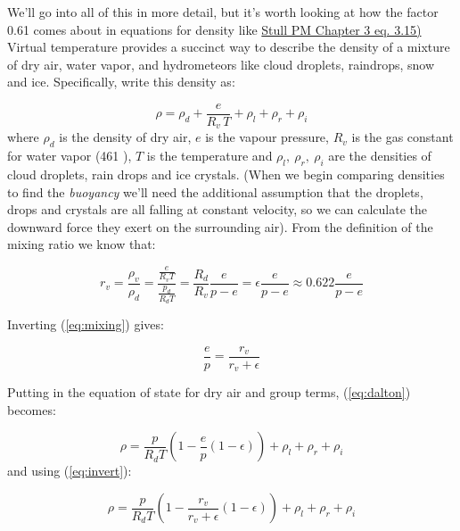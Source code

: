 \documentclass[12pt]{article}
\begin{document}
We'll go into all of this in more detail, but it's worth looking at how
the factor 0.61 comes about in equations for density like 
\href{https://www.eoas.ubc.ca/books/Practical_Meteorology/prmet102/Ch03-thermo-v102b.pdf}%
{Stull PM Chapter 3 eq. 3.15)}
Virtual temperature provides a succinct way to describe the density of a mixture of
dry air, water vapor, and hydrometeors like cloud droplets, raindrops, snow and ice.
Specifically, write this density as:

  \begin{equation}
    \label{eq:dalton}
    \rho = \rho_d + \frac{e}{R_v\, T} + \rho_l + \rho_r + \rho_i
  \end{equation}
where $\rho_d$ is the density of dry air, $e$ is the vapour pressure, $R_v$ is the
gas constant for water vapor (461 \jkgk), $T$ is the temperature and
$\rho_l,\  \rho_r,\ \rho_i$ are the densities of cloud droplets, rain drops and ice
crystals.  (When we begin comparing densities to find the \textit{buoyancy} we'll
need the additional assumption that the droplets, drops and crystals are all
falling at constant velocity, so we can calculate the downward force they exert
on the surrounding air). From the definition of the mixing ratio we know that:

\begin{equation}
  \label{eq:mixing}
  r_v = \frac{\rho_v}{\rho_d} = \frac{\frac{e}{R_v T}}{\frac{p_d}{R_d T}} = \frac{R_d}{R_v} \frac{e}{p-e}
      = \epsilon \frac{e}{p-e} \approx 0.622 \frac{e}{p-e}
\end{equation}

Inverting (\ref{eq:mixing}) gives:

\begin{equation}
  \label{eq:invert}
  \frac{e}{p} = \frac{r_v}{r_v + \epsilon}
\end{equation}

Putting in the equation of state for dry air and group terms, (\ref{eq:dalton}) becomes:

\begin{equation}
  \label{eq:rho2}
      \rho = \frac{p}{R_d T} \left ( 1 - \frac{e}{p} (1 - \epsilon) \right ) + \rho_l + \rho_r + \rho_i
\end{equation}
and using (\ref{eq:invert}):

\begin{equation}
  \label{eq:rho3}
      \rho = \frac{p}{R_d T} \left ( 1 - \frac{r_v}{r_v + \epsilon} (1 - \epsilon) \right ) + \rho_l + \rho_r + \rho_i
\end{equation}
\end{document}
